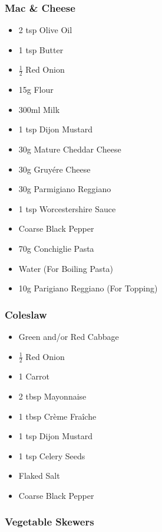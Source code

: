 \documentclass[11pt, english]{article}
\begin{document}
		\subsubsection*{Mac \& Cheese}

	\begin{itemize}
        \setlength\itemsep{0cm}
                \item 2 tsp Olive Oil
		\item 1 tsp Butter
		\item $\frac{1}{2}$ Red Onion
		\item 15g Flour
		\item 300ml Milk
		\item 1 tsp Dijon Mustard
		\item 30g Mature Cheddar Cheese
		\item 30g Gruy\'{e}re Cheese
		\item 30g Parmigiano Reggiano
		\item 1 tsp Worcestershire Sauce
		\item Coarse Black Pepper
		\item 70g Conchiglie Pasta
		\item Water (For Boiling Pasta)
		\item 10g Parigiano Reggiano (For Topping)
        \end{itemize}

		\subsubsection*{Coleslaw}

	\begin{itemize}
        \setlength\itemsep{0cm}
                \item Green and/or Red Cabbage
		\item $\frac{1}{2}$ Red Onion
		\item 1 Carrot
		\item 2 tbsp Mayonnaise
		\item 1 tbsp Cr\`{e}me Fra\^{i}che
		\item 1 tsp Dijon Mustard
		\item 1 tsp Celery Seeds
		\item Flaked Salt
		\item Coarse Black Pepper
        \end{itemize}

		\subsubsection*{Vegetable Skewers}
\end{document}
